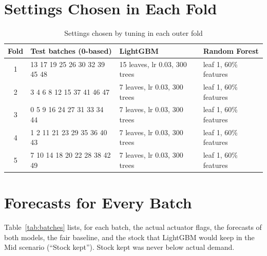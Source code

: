 \documentclass[12pt,oneside]{report}
\begin{document}
\appendix
\chapter{Settings Chosen in Each Fold}
\label{app:settings}

\begin{table}[htbp]
\centering\small
\caption[Settings chosen in each fold]{Settings chosen by tuning in each outer fold}
\label{tab:chosen}
\begin{tabular}{@{}clll@{}}
\toprule
\textbf{Fold} & \textbf{Test batches (0-based)} & \textbf{LightGBM} & \textbf{Random Forest}\\
\midrule
1 & 13 17 19 25 26 30 32 39 45 48 & 15 leaves, lr 0.03, 300 trees & leaf 1, 60\% features\\
2 & 3 4 6 8 12 15 37 41 46 47 & 7 leaves, lr 0.03, 300 trees & leaf 1, 60\% features\\
3 & 0 5 9 16 24 27 31 33 34 44 & 7 leaves, lr 0.03, 300 trees & leaf 1, 60\% features\\
4 & 1 2 11 21 23 29 35 36 40 43 & 7 leaves, lr 0.03, 300 trees & leaf 1, 60\% features\\
5 & 7 10 14 18 20 22 28 38 42 49 & 7 leaves, lr 0.03, 300 trees & leaf 1, 60\% features\\
\bottomrule
\end{tabular}
\end{table}

\chapter{Forecasts for Every Batch}
\label{app:batches}

Table~\ref{tab:batches} lists, for each batch, the actual actuator flags, the forecasts of both models, the fair baseline, and the stock that LightGBM would keep in the Mid scenario (``Stock kept''). Stock kept was never below actual demand.
\end{document}
